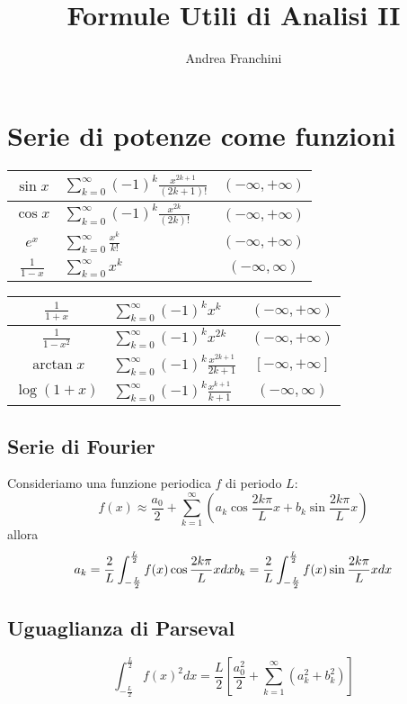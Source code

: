 \documentclass[10pt,a4paper,fleqn]{article}
\author{Andrea Franchini}
\title{Formule Utili di Analisi II}
\begin{document}
    \section*{Serie di potenze come funzioni}
    \renewcommand{\arraystretch}{2}
    \begin{tabular}{|c|l|c|}
        \hline
        $\sin x$
        &$\sum^{\infty}_{k=0}(-1)^k\frac{x^{2k+1}}{(2k+1)!}$
        &$(-\infty, +\infty)$\\
        \hline
        $\cos x$
        &$\sum^{\infty}_{k=0}(-1)^k\frac{x^{2k}}{(2k)!}$
        &$(-\infty, +\infty)$\\
        \hline
        $e^x$
        &$\sum^{\infty}_{k=0}\frac{x^k}{k!}$
        &$(-\infty, +\infty)$\\
        \hline
        $\frac{1}{1-x}$
        &$\sum^{\infty}_{k=0}x^k$
        &$(-\infty, \infty)$\\
        \hline
    \end{tabular}
    \begin{tabular}{|c|l|c|}
        \hline
        $\frac{1}{1+x}$
        &$\sum^{\infty}_{k=0} (-1)^k x^k$
        &$(-\infty, +\infty)$\\
        \hline
        $\frac{1}{1-x^2}$
        &$\sum^{\infty}_{k=0} (-1)^k x^{2k}$
        &$(-\infty, +\infty)$\\
        \hline
        $\arctan x$
        &$\sum^{\infty}_{k=0} (-1)^k\frac{x^{2k+1}}{2k+1}$
        &$[-\infty, +\infty]$\\
        \hline
        $\log (1+x)$
        &$\sum^{\infty}_{k=0}(-1)^k \frac{x^{k+1}}{k+1}$
        &$(-\infty, \infty)$\\
        \hline
    \end{tabular}
    \subsection*{Serie di Fourier}
    Consideriamo una funzione periodica $f$ di periodo $L$:
    \[
    f(x) \approx \frac{a_0}{2} + \sum_{k=1}^{\infty}\left(a_k \cos \frac{2k\pi}{L}x + b_k \sin\frac{2k\pi}{L}x\right)
    \]
    allora
    \[
    a_k = \frac{2}{L}\int^{\frac{L}{2}}_{-\frac{L}{2}}f(x)\cos\frac{2k\pi}{L}xdx\\
    b_k = \frac{2}{L}\int^{\frac{L}{2}}_{-\frac{L}{2}}f(x)\sin\frac{2k\pi}{L}xdx
    \]
    \subsection*{Uguaglianza di Parseval}
    \[
    \int^{\frac{L}{2}}_{-\frac{L}{2}}f(x)^2dx = \frac{L}{2}\left[\frac{a_0^2}{2} + \sum_{k=1}^{\infty}\left(a^2_k + b^2_k\right)\right]
    \]
\end{document}
